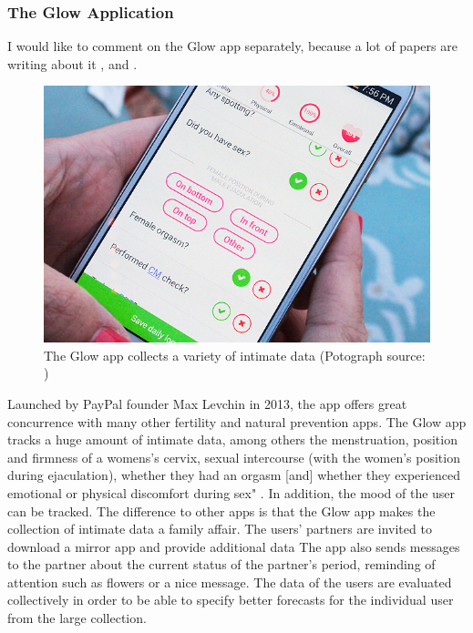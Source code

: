 \subsubsection{The Glow Application}
I would like to comment on the Glow app separately, because a lot of papers are writing about it \cite{doi:10.1080/15265161.2017.1409823}, \cite{levy2014intimate} and \cite{doi:10.1080/13691058.2014.920528}.
\begin{figure}[htb]
	\centering
	\includegraphics[width=\linewidth]{img/Glow-App-review-screenshot-1.jpg}
	\caption{The Glow app collects a variety of intimate data (Potograph source: \cite{glowApp})}
	\label{fig:glow_app}
\end{figure}
Launched by PayPal founder Max Levchin in 2013, the app offers great concurrence with many other fertility and natural prevention apps. The Glow app tracks a huge amount of intimate data, among others the menstruation, position and firmness of a womens's cervix, sexual intercourse (with the women's position during ejaculation), whether they had an orgasm [and] whether they experienced emotional or physical discomfort during sex" \cite{doi:10.1080/13691058.2014.920528}. In addition, the mood of the user can be tracked.
The difference to other apps is that the Glow app makes the collection of intimate data a family affair. The users' partners are invited to download a mirror app and provide additional data \cite{levy2014intimate} The app also sends messages to the partner about the current status of the partner's period, reminding of attention such as flowers or a nice message.
The data of the users are evaluated collectively in order to be able to specify better forecasts for the individual user from the large collection.

